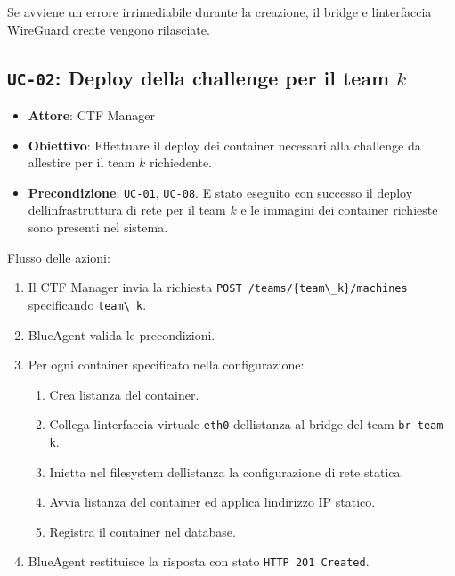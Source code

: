 Se avviene un errore irrimediabile durante la creazione, il bridge e
l\textquotesingle interfaccia WireGuard create vengono rilasciate.

\subsection{\texorpdfstring{\texttt{UC-02}: Deploy della challenge per
il team
\(k\)}{UC-02: Deploy della challenge per il team k}}\label{uc-02-deploy-della-challenge-per-il-team-k}

\begin{itemize}
\tightlist
\item
  \textbf{Attore}: CTF Manager
\item
  \textbf{Obiettivo}: Effettuare il deploy dei container necessari alla
  challenge da allestire per il team \(k\) richiedente.
\item
  \textbf{Precondizione}: \passthrough{\lstinline!UC-01!},
  \passthrough{\lstinline!UC-08!}. E\textquotesingle{} stato eseguito
  con successo il deploy dell\textquotesingle infrastruttura di rete per
  il team \(k\) e le immagini dei container richieste sono presenti nel
  sistema.
\end{itemize}

Flusso delle azioni:

\begin{enumerate}
\def\labelenumi{\arabic{enumi}.}
\tightlist
\item
  Il CTF Manager invia la richiesta
  \passthrough{\lstinline!POST /teams/\{team\_k\}/machines!}
  specificando \passthrough{\lstinline!team\_k!}.
\item
  BlueAgent valida le precondizioni.
\item
  Per ogni container specificato nella configurazione:

  \begin{enumerate}
  \def\labelenumii{\arabic{enumii}.}
  \tightlist
  \item
    Crea l\textquotesingle istanza del container.
  \item
    Collega l\textquotesingle interfaccia virtuale
    \passthrough{\lstinline!eth0!} dell\textquotesingle istanza al
    bridge del team \passthrough{\lstinline!br-team-k!}.
  \item
    Inietta nel filesystem dell\textquotesingle istanza la
    configurazione di rete statica.
  \item
    Avvia l\textquotesingle istanza del container ed applica
    l\textquotesingle indirizzo IP statico.
  \item
    Registra il container nel database.
  \end{enumerate}
\item
  BlueAgent restituisce la risposta con stato
  \passthrough{\lstinline!HTTP 201 Created!}.
\end{enumerate}

